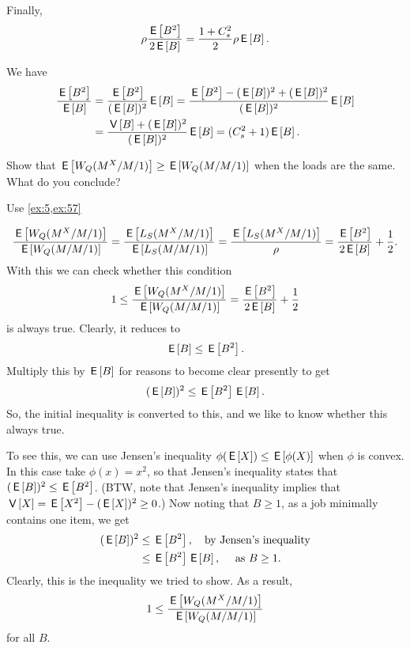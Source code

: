 \begin{extra}\label{q:batch}
Finally, 
\begin{equation*}
\rho  \frac{\E{B^2}}{2\E{B}} = \frac{1+C_s^2}{2} \rho \E B.
\end{equation*}
  \begin{solution}
We have
\begin{align*}
  \frac{\E{B^2}}{\E{B}}
&=    \frac{\E{B^2}}{(\E B)^2} \E B 
=    \frac{\E{B^2} - (\E B)^2 + (\E B)^2}{(\E B)^2} \E B  \\
&= \frac{\V B + (\E B)^2}{(\E B)^2}\E B = (C_s^2+1)\E B.
\end{align*}
  \end{solution}
\end{extra}


\begin{exercise}
  Show that $\E{W_Q(M^X/M/1)} \geq \E{W_Q(M/M/1)}$ when the loads are the same.
  What do you conclude?
  \begin{hint}
Use \cref{ex:5,ex:57}
  \end{hint}
  \begin{solution}
    \begin{equation*}
    \frac{\E{W_Q(M^X/M/1)}}{\E{W_Q(M/M/1)}} = \frac{\E{L_S(M^X/M/1)}}{\E{L_S(M/M/1)}} = \frac{\E{L_S(M^X/M/1)}}{\rho} = 
\frac{\E{B^2}}{2\E B} + \frac 12.
    \end{equation*}
With this we can check whether this condition
    \begin{equation*}
    1\leq \frac{\E{W_Q(M^X/M/1)}}{\E{W_Q(M/M/1)}} = \frac{\E{B^2}}{2\E B} + \frac 12
    \end{equation*}
    is always true. Clearly, it reduces to
\begin{equation*}
\E B \leq  \E{B^2}.
\end{equation*}
Multiply this by $\E B$ for reasons to become clear presently to get
\begin{equation*}
(\E B)^2 \leq  \E{B^2} \E B.
\end{equation*}
So, the initial inequality is converted to this, and we like to know
whether this always true.


To see this, we can use Jensen's inequality $\phi(\E X) \leq \E{\phi(X)}$ when $\phi$ is convex.
In this case take $\phi(x)=x^2$, so that Jensen's inequality states that $(\E B)^2 \leq \E{B^2}$.
(BTW, note that Jensen's inequality implies that $\V X = \E{X^2} - (\E X)^2\geq 0$.)
Now noting that $B\geq 1$, as a job minimally contains one item, we get
\begin{equation*}
  \begin{split}
(\E B)^2 
&\leq  \E{B^2}, \quad{\text{by Jensen's inequality}} \\
&\leq   \E{B^2} \E B, \quad{\text{ as } B \geq 1}.
  \end{split}
\end{equation*}
Clearly, this is the inequality we tried to show. As a result,
    \begin{equation*}
    1\leq \frac{\E{W_Q(M^X/M/1)}}{\E{W_Q(M/M/1)}}
    \end{equation*}
for all $B$. 


\end{solution}
\end{exercise}
